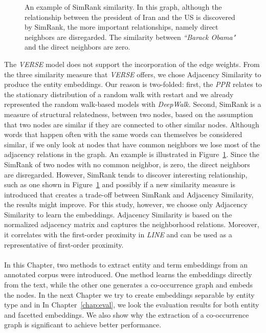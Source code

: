 \begin{figure}
\centering 
\resizebox{0.50\textwidth}{0.35\textwidth}{      

}
\caption{An example of SimRank similarity. In this graph, although the relationship between the president of Iran and the US is discovered by SimRank, the more important relationships, namely direct neighbors are disregarded. The similarity between \emph{``Barack Obama"} and the direct neighbors are zero.  }
\label{fig:simrank}
\end{figure}
The \emph{VERSE} model does not support the incorporation of the edge weights. From the three similarity measure that \emph{VERSE} offers, we chose Adjacency Similarity to produce the entity embeddings. Our reason is two-folded: first, the \emph{PPR} relates to the stationary distribution of a random walk with restart and we already represented the random walk-based models with \emph{DeepWalk.} Second, SimRank is a measure of structural relatedness, between two nodes, based on the assumption that two nodes are
similar if they are connected to other similar nodes. Although words that happen often with the same words can themselves be considered similar, if we only look at nodes that have common neighbors we lose most of the adjacency relations in the graph. An example is illustrated in Figure~\ref{fig:simrank}. Since the SimRank of two nodes with no common neighbor, is zero, the direct neighbors are disregarded. However, SimRank tends to discover interesting relationship, such as one shown in Figure~\ref{fig:simrank} and possibly if a new similarity measure is introduced that creates a trade-off between SimRank and Adjacency Similarity, the results might improve. For this study, however, we choose only Adjacency Similarity to learn the embeddings. Adjacency Similarity is based on the normalized adjacency matrix and captures the neighborhood relations. Moreover, it correlates with the first-order proximity in \emph{LINE} and can be used as a representative of first-order proximity. \\
\\
In this Chapter,  two methods to extract entity and term embeddings from an annotated corpus were introduced. One method learns the embeddings directly from the text, while the other one generates a co-occurrence graph and embeds the nodes. In the next Chapter we try to create embeddings separable by entity type and in In Chapter~\ref{chap:eval}, we look the evaluation results for both entity and facetted embeddings. We also show why the extraction of a co-occurrence graph is significant to achieve better performance. 